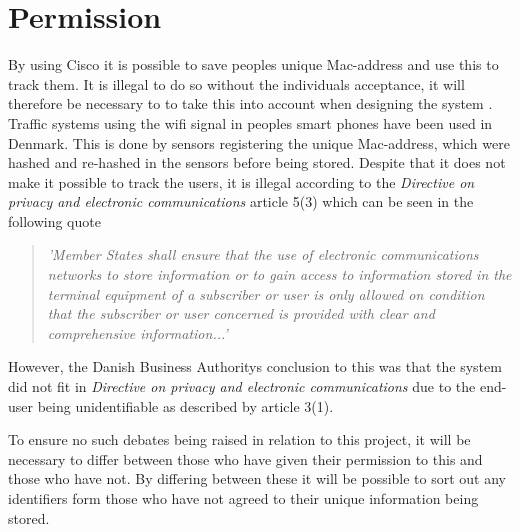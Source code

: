 \section{Permission}
By using Cisco it is possible to save peoples unique Mac-address and use this to track them. It is illegal to do so without the individuals acceptance, it will therefore be necessary to to take this into account when designing the system \cite{TrafficIlligal}.
Traffic systems using the wifi signal in peoples smart phones have been used in Denmark. This is done by sensors registering the unique Mac-address, which were hashed and re-hashed in the sensors before being stored. Despite that it does not make it possible to track the users\cite{TrafficIligal}, it is illegal according to the \textit{Directive on privacy and electronic communications} article 5(3)\cite{CookieDirective} which can be seen in the following quote

\begin{quote}
\textit{'Member States shall ensure that the use of electronic communications networks to store information or to gain access to information stored in the terminal equipment of a subscriber or user is only allowed on condition that the subscriber or user concerned is provided with clear and comprehensive information...'}
\end{quote}

However, the Danish Business Authoritys conclusion to this was that the system did not fit in \textit{Directive on privacy and electronic communications} due to the end-user being unidentifiable\cite{TrafficOK} as described by article 3(1)\cite{CookieDirective}.

To ensure no such debates being raised in relation to this project, it will be necessary to differ between those who have given their permission to this and those who have not. By differing between these it will be possible to sort out any identifiers form those who have not agreed to their unique information being stored.
